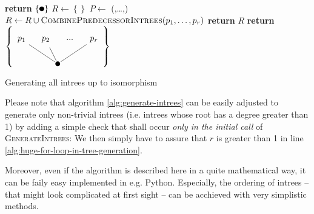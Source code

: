 \begin{algorithm}
  \begin{algorithmic}[5]
     
        \State \textbf{return} $\left\{ \tikz{\fill(0,0) circle (0.1cm);} \right\}$ 
      \EndIf
      \State $R \gets \left\{  \right\}$ 
          \label{alg:huge-for-loop-in-tree-generation}
        \State $P \gets$ (,\dots,) 
           
          \State $R \gets R \cup \Call{CombinePredecessorIntrees}{p_1,\dots,p_r}$
          \EndIf
        \EndFor
      \EndFor
      \State \textbf{return} $R$
    \EndProcedure
    \Statex
    \State \textbf{return} $\left\{
      \tikz[baseline=(current bounding box.center)]{
        \fill (-0.5,0)circle(0.1cm);
        \node(root) at (-0.5,0){};
        \node[circle](1) at (-2,1) {$p_1$};
        \node[circle](2) at (-1,1) {$p_2$};
        \node[circle](p) at (0,1) {...};
        \node[circle](r) at (1,1) {$p_r$};
        \draw[-] (1) -- (root);
        \draw[-] (2) -- (root);
        \draw[-] (r) -- (root);
      }
      \right\} $
    \EndProcedure
  \end{algorithmic}
  \caption{Generating all intrees up to isomorphism}
  \label{alg:generate-intrees}
\end{algorithm}

Please note that algorithm \ref{alg:generate-intrees} can be easily adjusted to generate only non-trivial intrees (i.e. intrees whose root has a degree greater than 1) by adding a simple check that shall occur \emph{only in the initial call} of \textsc{GenerateIntrees}: We then simply have to assure that $r$ is greater than 1 in line \ref{alg:huge-for-loop-in-tree-generation}.

Moreover, even if the algorithm is described here in a quite mathematical way, it can be faily easy implemented in e.g. Python. Especially, the ordering of intrees -- that might look complicated at first sight -- can be acchieved with very simplistic methods.

